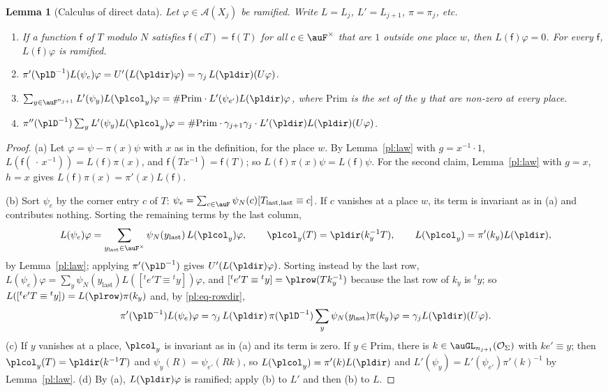 \documentclass[10pt]{amsart}
\newtheorem{lemma}[theorem]{Lemma}
\theoremstyle{definition}
\theoremstyle{remark}
\providecommand{\auO}{\mathcal O}
\begin{document}
\begin{lemma}[Calculus of direct data]\label{pl:calc}
Let $\varphi\in\mathcal A(X_j)$ be ramified. Write $L=L_j$, $L'=L_{j+1}$, $\pi=\pi_j$, etc.
\begin{enumerate}
\item[(a)] If a function $\mathsf f$ of $T$ modulo $N$ satisfies $\mathsf f(cT)=\mathsf f(T)$
for all $c\in\auF^\times$ that are $1$ outside one place $w$, then $L(\mathsf f)\varphi=0$. For
every $\mathsf f$, $L(\mathsf f)\varphi$ is ramified.
\item[(b)] $\pi'(\plD^{-1})L(\psi_e)\varphi=U'\bigl(L(\pldir)\varphi\bigr)=\gamma_j\,L(\pldir)
(U\varphi)$.
\item[(c)] $\sum_{y\in\auF^{n_{j+1}}}L'(\psi_y)L(\plcol_y)\varphi=\#\mathrm{Prim}\cdot L'(\psi_{e'})
L(\pldir)\varphi$, where $\mathrm{Prim}$ is the set of the $y$ that are non-zero at every place.
\item[(d)] $\pi''(\plD^{-1})\sum_yL'(\psi_y)L(\plcol_y)\varphi=\#\mathrm{Prim}\cdot\gamma_{j+1}
\gamma_j\cdot L'(\pldir)L(\pldir)(U\varphi)$.
\end{enumerate}
\end{lemma}
\begin{proof}
(a) Let $\varphi=\psi-\pi(x)\psi$ with $x$ as in the definition, for the place $w$. By
Lemma~\ref{pl:law} with $g=x^{-1}\cdot1$, $L(\mathsf f(\,\cdot\,x^{-1}))=L(\mathsf f)\pi(x)$, and
$\mathsf f(Tx^{-1})=\mathsf f(T)$; so $L(\mathsf f)\pi(x)\psi=L(\mathsf f)\psi$. For the second
claim, Lemma~\ref{pl:law} with $g=x$, $h=x$ gives $L(\mathsf f)\pi(x)=\pi'(x)L(\mathsf f)$.

(b) Sort $\psi_e$ by the corner entry $c$ of $T$: $\psi_e=\sum_{c\in\auF}\psi_N(c)[T_{\mathrm{
last,last}}\equiv c]$. If $c$ vanishes at a place $w$, its term is invariant as in (a) and
contributes nothing. Sorting the remaining terms by the last column,
\[
L(\psi_e)\varphi=\sum_{y_{\mathrm{last}}\in\auF^\times}\psi_N(y_{\mathrm{last}})\,L(\plcol_y)
\varphi,\qquad\plcol_y(T)=\pldir(k_y^{-1}T),\qquad L(\plcol_y)=\pi'(k_y)L(\pldir),
\]
by Lemma~\ref{pl:law}; applying $\pi'(\plD^{-1})$ gives $U'(L(\pldir)\varphi)$. Sorting instead by
the last row, $L(\psi_e)\varphi=\sum_y\psi_N(y_{\mathrm{last}})L([{}^te'T\equiv{}^ty])\varphi$, and
$[{}^te'T\equiv{}^ty]=\plrow(Tk_y^{-1})$ because the last row of $k_y$ is ${}^ty$; so
$L([{}^te'T\equiv{}^ty])=L(\plrow)\pi(k_y)$ and, by \eqref{pl:eq-rowdir},
\[
\pi'(\plD^{-1})L(\psi_e)\varphi=\gamma_j\,L(\pldir)\,\pi(\plD^{-1})\sum_y\psi_N(y_{\mathrm{last}})
\pi(k_y)\varphi=\gamma_jL(\pldir)(U\varphi).
\]
(c) If $y$ vanishes at a place, $\plcol_y$ is invariant as in (a) and its term is zero. If
$y\in\mathrm{Prim}$, there is $k\in\auGL_{n_{j+1}}(\auO_\Sigma)$ with $ke'\equiv y$; then
$\plcol_y(T)=\pldir(k^{-1}T)$ and $\psi_y(R)=\psi_{e'}(Rk)$, so $L(\plcol_y)=\pi'(k)L(\pldir)$ and
$L'(\psi_y)=L'(\psi_{e'})\pi'(k)^{-1}$ by Lemma~\ref{pl:law}. (d) By (a), $L(\pldir)\varphi$ is
ramified; apply (b) to $L'$ and then (b) to $L$.
\end{proof}
\end{document}
